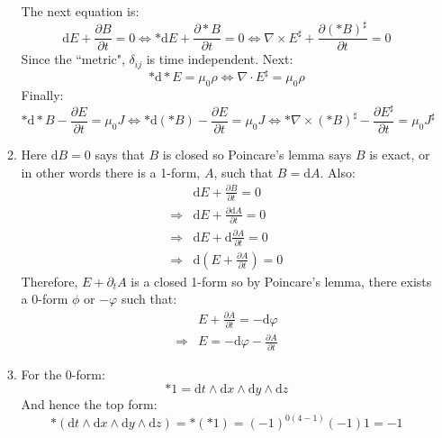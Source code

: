 \documentclass[12pt,a4]{article}
\newcommand{\e}{\mathrm{d}}
\begin{document}
\begin{enumerate}
\begin{enumerate}
        The next equation is:
        \begin{equation*}
          \e E + \frac{\partial B}{\partial t} = 0 \Leftrightarrow * \e E +  \frac{\partial * B}{\partial t} = 0 \Leftrightarrow  \nabla \times E^\sharp + \frac{\partial (* B)^\sharp}{\partial t} = 0
        \end{equation*}
        Since the ``metric", $\delta_{ij}$ is time independent.
        Next:
        \begin{equation*}
          * \e * E = \mu_0 \rho \Leftrightarrow  \nabla \cdot E^\sharp = \mu_0 \rho
        \end{equation*}
        Finally:
        \begin{equation*}
          * \e * B - \frac{\partial E}{\partial t} = \mu_0 J \Leftrightarrow * \e (* B) - \frac{\partial E}{\partial t} = \mu_0 J \Leftrightarrow * \nabla \times (*B)^\sharp - \frac{\partial E^\sharp}{\partial t} = \mu_0 J^\sharp
        \end{equation*}
      \item
        Here $\e B = 0$ says that $B$ is closed so Poincare's lemma says $B$ is exact, or in other words there is a 1-form, $A$, such that $B = \e A$.
        Also:
        \begin{align*}
                      & \e E + \frac{\partial B}{\partial t} = 0\\
          \Rightarrow & \e E + \frac{\partial \e A}{\partial t} = 0\\
          \Rightarrow & \e E + \e \frac{\partial A}{\partial t} = 0\\
          \Rightarrow & \e \left(E + \frac{\partial A}{\partial t}\right) = 0
        \end{align*}
        Therefore, $E + \partial_t A$ is a closed 1-form so by Poincare's lemma, there exists a 0-form $\phi$ or $-\varphi$ such that:
        \begin{align*}
                      & E + \frac{\partial A}{\partial t} = - \e \varphi\\
          \Rightarrow & E  = - \e \varphi - \frac{\partial A}{\partial t}
        \end{align*}
      \item
        For the 0-form:
        \begin{equation*}
          *1 = \e t \wedge \e x \wedge \e y \wedge \e z
        \end{equation*}
        And hence the top form:
        \begin{equation*}
          *(\e t \wedge \e x \wedge \e y \wedge \e z) = *(*1) = (-1)^{0(4-1)}(-1) 1 = -1

\end{equation*}
\end{enumerate}
\end{enumerate}
\end{document}
